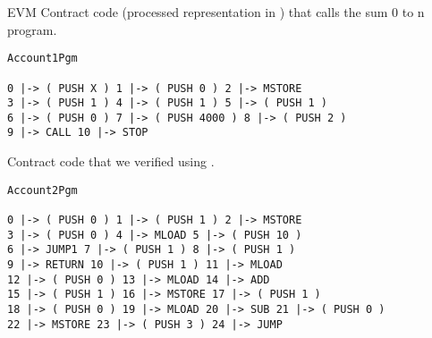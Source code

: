 EVM Contract code (processed representation in \K{} ) that calls the sum 0 to n program.

\begin{verbatim}
Account1Pgm

0 |-> ( PUSH X ) 1 |-> ( PUSH 0 ) 2 |-> MSTORE
3 |-> ( PUSH 1 ) 4 |-> ( PUSH 1 ) 5 |-> ( PUSH 1 )
6 |-> ( PUSH 0 ) 7 |-> ( PUSH 4000 ) 8 |-> ( PUSH 2 )
9 |-> CALL 10 |-> STOP

\end{verbatim}
Contract code that we verified using \K{}.


\begin{verbatim}
Account2Pgm

0 |-> ( PUSH 0 ) 1 |-> ( PUSH 1 ) 2 |-> MSTORE
3 |-> ( PUSH 0 ) 4 |-> MLOAD 5 |-> ( PUSH 10 )
6 |-> JUMP1 7 |-> ( PUSH 1 ) 8 |-> ( PUSH 1 )
9 |-> RETURN 10 |-> ( PUSH 1 ) 11 |-> MLOAD
12 |-> ( PUSH 0 ) 13 |-> MLOAD 14 |-> ADD
15 |-> ( PUSH 1 ) 16 |-> MSTORE 17 |-> ( PUSH 1 )
18 |-> ( PUSH 0 ) 19 |-> MLOAD 20 |-> SUB 21 |-> ( PUSH 0 )
22 |-> MSTORE 23 |-> ( PUSH 3 ) 24 |-> JUMP
\end{verbatim}
